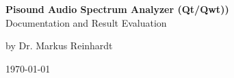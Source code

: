 \documentclass[11pt, oneside]{scrartcl}   	%
\begin{document}
	

\begingroup
\thispagestyle{empty}
\centering

\par\normalfont\fontsize{30}{30}\sffamily\selectfont
\vspace*{-0.5cm}
{\color{black}
	\textbf{\Huge Pisound Audio Spectrum Analyzer (Qt/Qwt))}\\
	\vspace*{1.5cm}
	{\textbf\huge Documentation and Result Evaluation}\par %
	\vspace*{0.5cm}
	{\textbf \huge by Dr. Markus Reinhardt}\par %
	\vspace*{1.5cm}
	{\textbf \huge \today}\par
}
\endgroup
\vfill


\newpage
\thispagestyle{empty}
\tableofcontents

\thispagestyle{empty}
\listoffigures

\newpage
\pagestyle{scrheadings}
\end{document}
